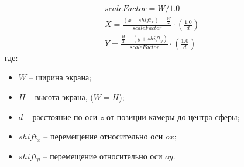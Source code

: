 \begin{equation} \label{eq:circle_to_sphere}
\begin{gathered}
	scaleFactor = W / 1.0 \\
	X = \frac{(x + shift_x) - \frac{W}{2}}{scaleFactor} \cdot \left( \frac{1.0}{d} \right) \\
	Y = \frac{\frac{H}{2} - (y + shift_y)}{scaleFactor} \cdot \left( \frac{1.0}{d} \right)
\end{gathered}
\end{equation}
где: 
\begin{itemize}	
	\item $W$ -- ширина экрана;
	\item $H$ -- высота экрана, ($W = H$);
	\item $d$ -- расстояние по оси $z$ от позиции камеры до центра сферы;
	\item $shift_x$ -- перемещение относительно оси $ox$;
	\item $shift_y$ -- перемещение относительно оси $oy$.
\end{itemize}